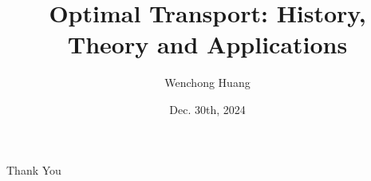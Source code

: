 \documentclass[10pt]{beamer}
\author{Wenchong Huang}
\title{Optimal Transport: History, Theory and Applications}
\institute{
    School of Mathematical Sciences, \\
    Zhejiang University.
}
\date{Dec. 30th, 2024}
\begin{document}
\begin{frame}
    \titlepage
\end{frame}



\begin{frame}
    \begin{center}
        {\Huge\calligra Thank You}
    \end{center}
\end{frame}
\end{document}
